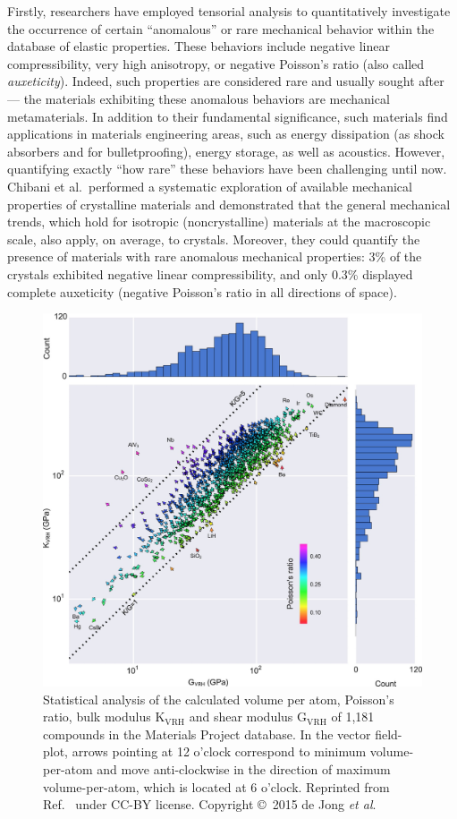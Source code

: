 \documentclass[main.tex]{subfiles}
\begin{document}
Firstly, researchers have employed tensorial analysis to quantitatively investigate the occurrence of certain ``anomalous'' or rare mechanical behavior within the database of elastic properties. These behaviors include negative linear compressibility, very high anisotropy, or negative Poisson's ratio (also called \emph{auxeticity}). Indeed, such properties are considered rare and usually sought after --- the materials exhibiting these anomalous behaviors are mechanical metamaterials.\autocite{Coudert_2019} In addition to their fundamental significance, such materials find applications in materials engineering areas, such as energy dissipation (as shock absorbers and for bulletproofing), energy storage, as well as acoustics.\autocite{Surjadi_2018} However, quantifying exactly ``how rare'' these behaviors have been challenging until now. Chibani et al.\ performed a systematic exploration of available mechanical properties of crystalline materials and demonstrated that the general mechanical trends, which hold for isotropic (noncrystalline) materials at the macroscopic scale, also apply, on average, to crystals. Moreover, they could quantify the presence of materials with rare anomalous mechanical properties: {3\%} of the crystals exhibited negative linear compressibility, and only {0.3\%} displayed complete auxeticity (negative Poisson's ratio in all directions of space).

\begin{figure}[ht]
\centering
  \includegraphics[width=0.75\linewidth]{figures/1-screening/deJong2015.jpeg}
  \caption{Statistical analysis of the calculated volume per atom, Poisson's ratio, bulk modulus {$\mathrm{K_{VRH}}$} and shear modulus {$\mathrm{G_{VRH}}$ of} 1,181 compounds in the Materials Project database. In the vector field-plot, arrows pointing at 12 o'clock correspond to minimum volume-per-atom and move anti-clockwise in the direction of maximum volume-per-atom, which is located at 6 o'clock. Reprinted from Ref.~\cite{deJong_2015} under CC-BY license. Copyright \copyright\  2015 de Jong \emph{et al}.}\label{fgr:deJong2015}
\end{figure}
\end{document}
